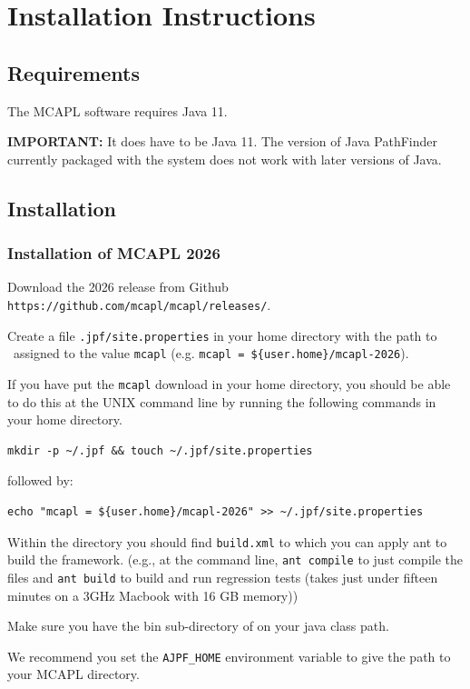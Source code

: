 \chapter{Installation Instructions}
\label{chap:installation}
\section{Requirements}

The MCAPL software requires Java 11.   

{\bf IMPORTANT:} It does have to be Java 11.  The version of Java PathFinder currently packaged with the system does not work with later versions of Java.

\section{Installation}

\subsection{Installation of MCAPL 2026}

\begin{itemize}
\begin{sloppypar}
\item Download the 2026 release from Github \texttt{https://github.com/mcapl/mcapl/releases/}.
\end{sloppypar}
\item Create a file \texttt{.jpf/site.properties} in your home directory with the path to \ajpfversion\ assigned to the value \texttt{mcapl}
  (e.g. \texttt{mcapl = \$\{user.home\}/mcapl-2026}).
  
If you have put the \texttt{mcapl} download in your home directory,  you should be able to do this at the UNIX command line by running the following commands in your home directory.
\begin{verbatim}
mkdir -p ~/.jpf && touch ~/.jpf/site.properties
\end{verbatim}
followed by:
\begin{verbatim}
echo "mcapl = ${user.home}/mcapl-2026" >> ~/.jpf/site.properties
\end{verbatim}

\item Within the \texttt{\ajpfversion} directory you should find \texttt{build.xml} to which you can apply ant to build the framework. (e.g., at the command line, \lstinline{ant compile} to just compile the files and \lstinline{ant build} to build and run regression tests (takes just under fifteen minutes on a 3GHz Macbook with 16 GB memory))
\item Make sure you have the bin sub-directory of \texttt{\ajpfversion} on your java class path.
\item We recommend you set the \texttt{AJPF\_HOME} environment variable to give the path to your MCAPL directory.
\end{itemize}

